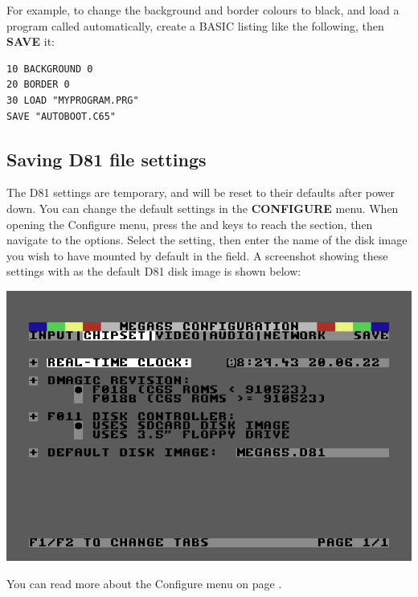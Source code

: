 For example, to change the background and border colours to black, and load a program called 
automatically, create a BASIC listing like the following, then {\bf SAVE} it:


\begin{tcolorbox}[colback=black,coltext=white]
\verbatimfont{\codefont}
\begin{verbatim}
10 BACKGROUND 0
20 BORDER 0
30 LOAD "MYPROGRAM.PRG"
SAVE "AUTOBOOT.C65"
\end{verbatim}
\end{tcolorbox}

\subsection{Saving D81 file settings}

The D81 settings are temporary, and will be reset to their defaults after power down. You can change the default settings
in the {\bf CONFIGURE} menu. When opening the Configure menu, press the  and  keys
to reach the  section, then navigate to the  options.
Select the  setting, then enter the name of the disk image you wish to have mounted
by default in the  field. A screenshot showing these settings with
 as the default D81 disk image is shown below:

\begin{center}
\includegraphics[width=0.7\linewidth]{images/ss-m65config-2.png}
\end{center}

You can read more about the Configure menu on page \pageref{sec:configuration-utility}.
